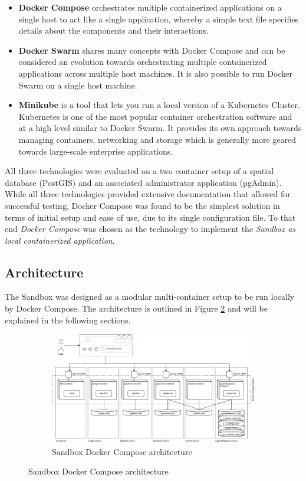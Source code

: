 \documentclass[11pt, a4paper, oneside, parskip=full-]{scrartcl}
\begin{document}
\begin{itemize}
  \item \textbf{Docker Compose} orchestrates multiple containerized applications
  on a single host to act like a single application, whereby a simple text file
  specifies details about the components and their interactions.
  \item \textbf{Docker Swarm}\cite{dockerswarm} shares many concepts with Docker
  Compose and can be considered an evolution towards orchestrating multiple
  containerized applications across multiple host machines. It is also possible
  to run Docker Swarm on a single host machine.
  \item \textbf{Minikube}\cite{minikube} is a tool that lets you run a local
  version of a Kubernetes Cluster. Kubernetes is one of the most popular
  container orchestration software and at a high level similar to Docker Swarm.
  It provides its own approach towards managing containers, networking and
  storage which is generally more geared towards large-scale enterprise
  applications.
\end{itemize}

All three technologies were evaluated on a two container setup of a spatial
database (PostGIS) and an associated administrator application (pgAdmin). While
all three technologies provided extensive documentation that allowed for
successful testing, Docker Compose was found to be the simplest solution in
terms of initial setup and ease of use, due to its single configuration file. To
that end \emph{Docker Compose} was chosen as the technology to implement the
\emph{Sandbox as local containerized application}.

\subsection{Architecture}
The Sandbox was designed as a modular multi-container setup to be run locally by
Docker Compose. The architecture is outlined in Figure \ref{fig:sandboxsetup}
and will be explained in the following sections. \\

 \begin{figure}
  \centering
  \begin{figure}[H]
    \centering
    \includegraphics[width=1\textwidth]{composeSetup.pdf}
    \caption{Sandbox Docker Compose architecture}
    \label{fig:sandboxsetup}
  \end{figure}
\end{figure}
\end{document}
